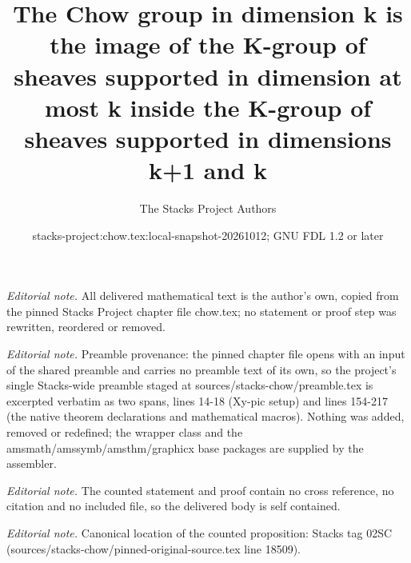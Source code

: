 \documentclass[10pt,a4paper]{amsart}
\title{The Chow group in dimension k is the image of the K-group of sheaves supported in dimension at most k inside the K-group of sheaves supported in dimensions k+1 and k}
\author{The Stacks Project Authors}
\date{stacks-project:chow.tex:local-snapshot-20261012; GNU FDL 1.2 or later}
\theoremstyle{plain}
\theoremstyle{definition}
\theoremstyle{remark}
\numberwithin{equation}{subsection}
\begin{document}
\maketitle
\noindent\textit{Editorial note.} All delivered mathematical text is the author's own, copied from the pinned Stacks Project chapter file chow.tex; no statement or proof step was rewritten, reordered or removed.\par\medskip
\noindent\textit{Editorial note.} Preamble provenance: the pinned chapter file opens with an input of the shared preamble and carries no preamble text of its own, so the project's single Stacks-wide preamble staged at sources/stacks-chow/preamble.tex is excerpted verbatim as two spans, lines 14-18 (Xy-pic setup) and lines 154-217 (the native theorem declarations and mathematical macros). Nothing was added, removed or redefined; the wrapper class and the amsmath/amssymb/amsthm/graphicx base packages are supplied by the assembler.\par\medskip
\noindent\textit{Editorial note.} The counted statement and proof contain no cross reference, no citation and no included file, so the delivered body is self contained.\par\medskip
\noindent\textit{Editorial note.} Canonical location of the counted proposition: Stacks tag 02SC (sources/stacks-chow/pinned-original-source.tex line 18509).\par\medskip
\end{document}
